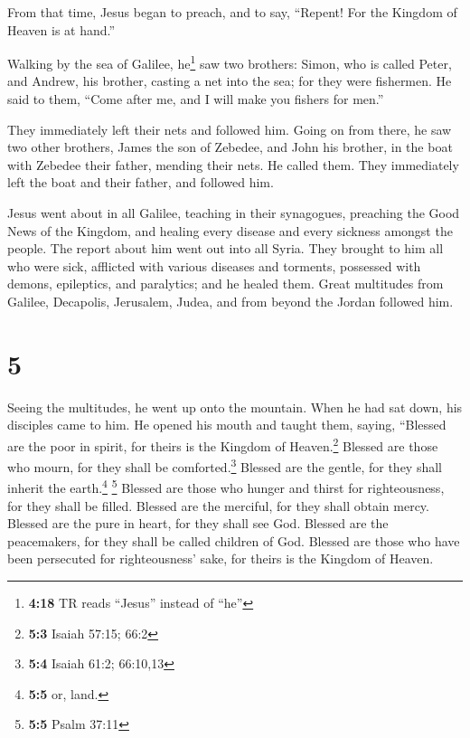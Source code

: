  From that time, Jesus began to preach, and to say,
``Repent! For the Kingdom of Heaven is at hand.''

 Walking by the sea of Galilee, he\footnote{\textbf{4:18}
  TR reads ``Jesus'' instead of ``he''} saw two brothers: Simon, who is
called Peter, and Andrew, his brother, casting a net into the sea; for
they were fishermen.  He said to them, ``Come after me,
and I will make you fishers for men.''

 They immediately left their nets and followed him.
 Going on from there, he saw two other brothers, James
the son of Zebedee, and John his brother, in the boat with Zebedee their
father, mending their nets. He called them.  They
immediately left the boat and their father, and followed him.

 Jesus went about in all Galilee, teaching in their
synagogues, preaching the Good News of the Kingdom, and healing every
disease and every sickness amongst the people.  The
report about him went out into all Syria. They brought to him all who
were sick, afflicted with various diseases and torments, possessed with
demons, epileptics, and paralytics; and he healed them. 
Great multitudes from Galilee, Decapolis, Jerusalem, Judea, and from
beyond the Jordan followed him.

\hypertarget{section-4}{%
\section{5}\label{section-4}}

 Seeing the multitudes, he went up onto the mountain. When
he had sat down, his disciples came to him.  He opened his
mouth and taught them, saying,  ``Blessed are the poor in
spirit, for theirs is the Kingdom of Heaven.\footnote{\textbf{5:3}
  Isaiah 57:15; 66:2}  Blessed are those who mourn, for
they shall be comforted.\footnote{\textbf{5:4} Isaiah 61:2; 66:10,13}
 Blessed are the gentle, for they shall inherit the
earth.\footnote{\textbf{5:5} or, land.} \footnote{\textbf{5:5} Psalm
  37:11}  Blessed are those who hunger and thirst for
righteousness, for they shall be filled.  Blessed are the
merciful, for they shall obtain mercy.  Blessed are the
pure in heart, for they shall see God.  Blessed are the
peacemakers, for they shall be called children of God. 
Blessed are those who have been persecuted for righteousness' sake, for
theirs is the Kingdom of Heaven.

